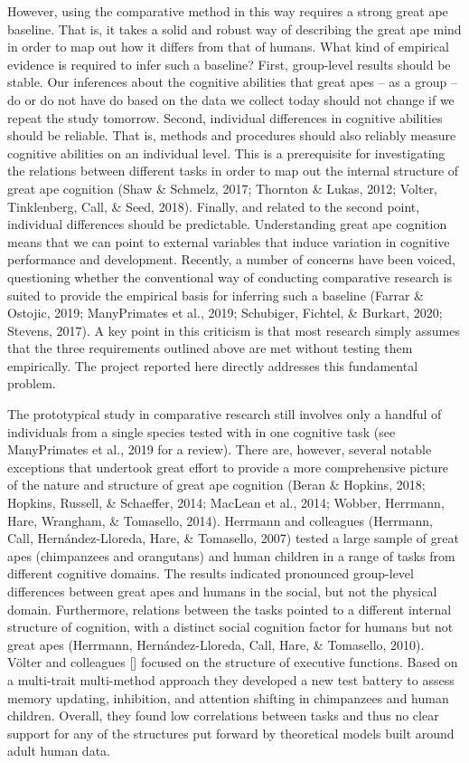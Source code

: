 \documentclass[
  man,floatsintext]{apa6}
\begin{document}
However, using the comparative method in this way requires a strong great ape baseline. That is, it takes a solid and robust way of describing the great ape mind in order to map out how it differs from that of humans. What kind of empirical evidence is required to infer such a baseline? First, group-level results should be stable. Our inferences about the cognitive abilities that great apes -- as a group -- do or do not have do based on the data we collect today should not change if we repeat the study tomorrow. Second, individual differences in cognitive abilities should be reliable. That is, methods and procedures should also reliably measure cognitive abilities on an individual level. This is a prerequisite for investigating the relations between different tasks in order to map out the internal structure of great ape cognition (Shaw \& Schmelz, 2017; Thornton \& Lukas, 2012; Volter, Tinklenberg, Call, \& Seed, 2018). Finally, and related to the second point, individual differences should be predictable. Understanding great ape cognition means that we can point to external variables that induce variation in cognitive performance and development. Recently, a number of concerns have been voiced, questioning whether the conventional way of conducting comparative research is suited to provide the empirical basis for inferring such a baseline (Farrar \& Ostojic, 2019; ManyPrimates et al., 2019; Schubiger, Fichtel, \& Burkart, 2020; Stevens, 2017). A key point in this criticism is that most research simply assumes that the three requirements outlined above are met without testing them empirically. The project reported here directly addresses this fundamental problem.

The prototypical study in comparative research still involves only a handful of individuals from a single species tested with in one cognitive task (see ManyPrimates et al., 2019 for a review). There are, however, several notable exceptions that undertook great effort to provide a more comprehensive picture of the nature and structure of great ape cognition (Beran \& Hopkins, 2018; Hopkins, Russell, \& Schaeffer, 2014; MacLean et al., 2014; Wobber, Herrmann, Hare, Wrangham, \& Tomasello, 2014). Herrmann and colleagues (Herrmann, Call, Hernández-Lloreda, Hare, \& Tomasello, 2007) tested a large sample of great apes (chimpanzees and orangutans) and human children in a range of tasks from different cognitive domains. The results indicated pronounced group-level differences between great apes and humans in the social, but not the physical domain. Furthermore, relations between the tasks pointed to a different internal structure of cognition, with a distinct social cognition factor for humans but not great apes (Herrmann, Hernández-Lloreda, Call, Hare, \& Tomasello, 2010). Völter and colleagues {[}{]} focused on the structure of executive functions. Based on a multi-trait multi-method approach they developed a new test battery to assess memory updating, inhibition, and attention shifting in chimpanzees and human children. Overall, they found low correlations between tasks and thus no clear support for any of the structures put forward by theoretical models built around adult human data.
\end{document}
